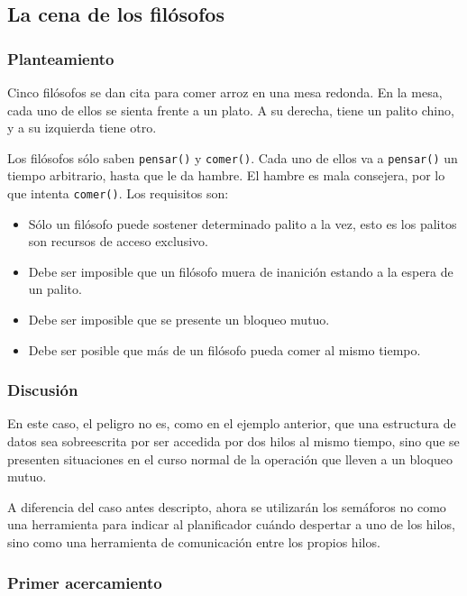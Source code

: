 \documentclass[11pt,fleqn]{book} %
\begin{document}
\subsection{La cena de los filósofos}
\label{sec-3-3-7}
\subsubsection{Planteamiento}
\label{sec-3-3-7-1}

      Cinco filósofos se dan cita para comer arroz en una mesa
      redonda. En la mesa, cada uno de ellos se sienta frente a un
      plato. A su derecha, tiene un palito chino, y a su izquierda
      tiene otro.

      Los filósofos sólo saben \texttt{pensar()} y \texttt{comer()}. Cada uno de
      ellos va a \texttt{pensar()} un tiempo arbitrario, hasta que le da
      hambre. El hambre es mala consejera, por lo que intenta
      \texttt{comer()}. Los requisitos son:

\begin{itemize}
\item Sólo un filósofo puede sostener determinado palito a la vez, esto es
       	los palitos son recursos de acceso exclusivo.
\item Debe ser imposible que un filósofo muera de inanición estando a
       	la espera de un palito.
\item Debe ser imposible que se presente un bloqueo mutuo.
\item Debe ser posible que más de un filósofo pueda comer al mismo
       	tiempo.
\end{itemize}
\subsubsection{Discusión}
\label{sec-3-3-7-2}

   En este caso, el peligro no es, como en el ejemplo anterior, que una
   estructura de datos sea sobreescrita por ser accedida por dos hilos
   al mismo tiempo, sino que se presenten situaciones en el curso normal de
   la operación que lleven a un bloqueo mutuo.

   A diferencia del caso antes descripto, ahora se utilizarán los
   semáforos no como una herramienta para indicar al planificador
   cuándo despertar a uno de los hilos, sino como una herramienta de
   comunicación entre los propios hilos.
\subsubsection{Primer acercamiento}
\label{sec-3-3-7-3}
\end{document}
